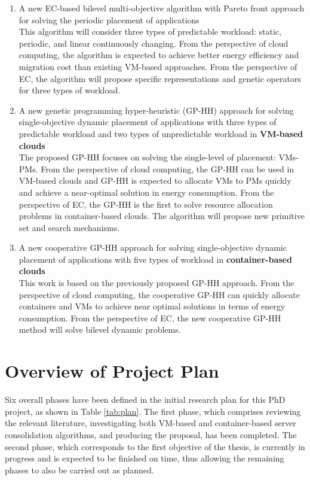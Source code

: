\begin{enumerate}
	\item A new EC-based bilevel multi-objective algorithm with Pareto front approach for solving the periodic placement of applications\\

	This algorithm will consider three types of predictable workload: static, periodic, and linear continuously changing. From the perspective of cloud computing, the algorithm is expected to achieve better energy efficiency and migration cost than existing VM-based approaches. From the perspective of EC, the algorithm will propose specific representations and genetic operators for three types of workload. 

	\item A new genetic programming hyper-heuristic (GP-HH) approach for solving single-objective dynamic placement of applications with three types of predictable workload and two types of unpredictable workload in \textbf{VM-based clouds} \\

	The proposed GP-HH focuses on solving the single-level of placement: VMs-PMs. From the perspective of cloud computing,
	the GP-HH can be used in VM-based clouds and GP-HH is expected to allocate VMs to PMs quickly and achieve a near-optimal solution in energy consumption.
	From the perspective of EC,  the GP-HH is the first to solve resource allocation problems in container-based clouds. The algorithm will propose new primitive set and search mechanisms.

	\item A new cooperative GP-HH approach for solving single-objective dynamic placement of applications with five types of workload in \textbf{container-based clouds} \\

	This work is based on the previously proposed GP-HH approach.
	From the perspective of cloud computing, the cooperative GP-HH can quickly allocate containers and VMs to achieve near optimal solutions in terms of energy consumption.
	From the perspective of EC, the new cooperative GP-HH method will solve bilevel dynamic problems.
\end{enumerate}

\section{Overview of Project Plan}
Six overall phases have been defined in the initial research plan for this PhD project, as
shown in Table \ref{tab:plan}. The first phase, which comprises reviewing the relevant literature, investigating both VM-based and container-based server consolidation algorithms, and producing the proposal, has
been completed. The second phase, which corresponds to the first objective of the thesis, is
currently in progress and is expected to be finished on time, thus allowing the remaining
phases to also be carried out as planned.



